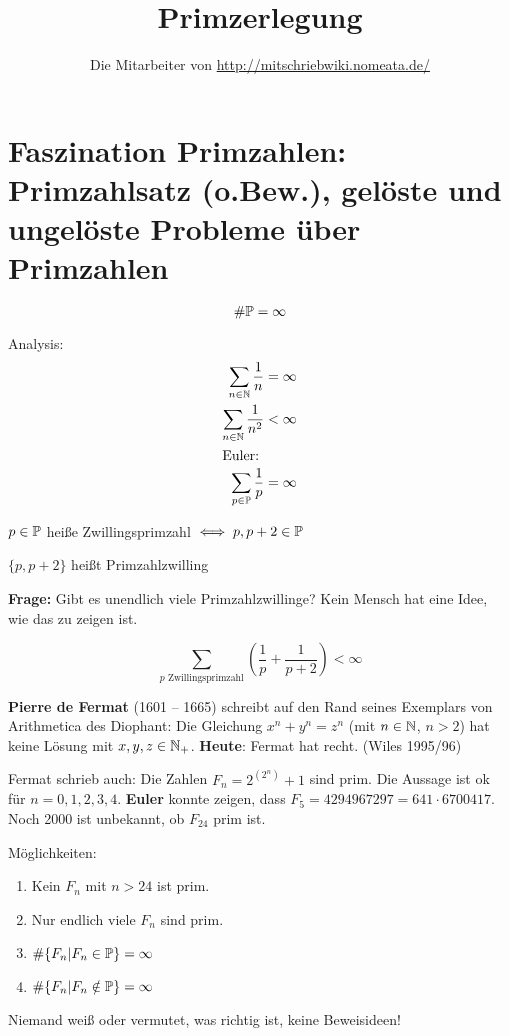 \documentclass[a4paper,DIV15,BCOR12mm]{article}
\author{Die Mitarbeiter von \url{http://mitschriebwiki.nomeata.de/}}
\title{Primzerlegung}
\begin{document}
\maketitle

\section[Einführung und Motivation]{Faszination Primzahlen: Primzahlsatz (o.Bew.), gelöste
und ungelöste Probleme über Primzahlen}

\begin{satz}
\[ \#\mathbb{P} = \infty \]
\end{satz}

\begin{bemerkung}
Analysis:
\begin{align*}
\sum_{n\in\mathbb{N}} \frac{1}{n} &= \infty \\
\sum_{n\in\mathbb{N}} \frac{1}{n^2} &< \infty \\
\intertext{Euler:} \sum_{p\in\mathbb{P}} \frac{1}{p}  &= \infty
\end{align*}
\end{bemerkung}

\begin{definition}
$p\in\mathbb{P}$ heiße Zwillingsprimzahl $\iff p, p+2 \in \mathbb{P}$

$\{p,p+2\}$ heißt Primzahlzwilling
\end{definition}

\textbf{Frage:} Gibt es unendlich viele Primzahlzwillinge? Kein
Mensch hat eine Idee, wie das zu zeigen ist.

\begin{satz}
\[ \sum_{p \text{ Zwillingsprimzahl}} \left(\frac1p + \frac 1 {p+2}\right) < \infty \]
\end{satz}

\textbf{Pierre de Fermat} (1601 -- 1665) schreibt auf den Rand
seines Exemplars von Arithmetica des Diophant: \glqq Die Gleichung
$x^n+y^n=z^n$ (mit $n\in\mathbb{N}$, $n>2$) hat keine Lösung mit $x,y,z
\in \mathbb{N}_+$\grqq. \textbf{Heute}: Fermat hat recht. (Wiles 1995/96)

Fermat schrieb auch: Die Zahlen $F_n = 2^{(2^n)}+1$ sind prim. Die
Aussage ist ok für $n=0,1,2,3,4$. \textbf{Euler} konnte zeigen, dass
$F_5  = 4294967297 = 641 \cdot 6700417$. Noch 2000 ist unbekannt, ob
$F_{24}$ prim ist.

Möglichkeiten:
\begin{enumerate}
\item Kein $F_n$ mit $n>24$ ist prim.
\item Nur endlich viele $F_n$ sind prim.
\item $\#\{F_n|F_n\in \mathbb{P}\} = \infty$
\item $\#\{F_n|F_n\notin \mathbb{P}\} = \infty$
\end{enumerate}
Niemand weiß oder vermutet, was richtig ist, keine Beweisideen!
\end{document}
